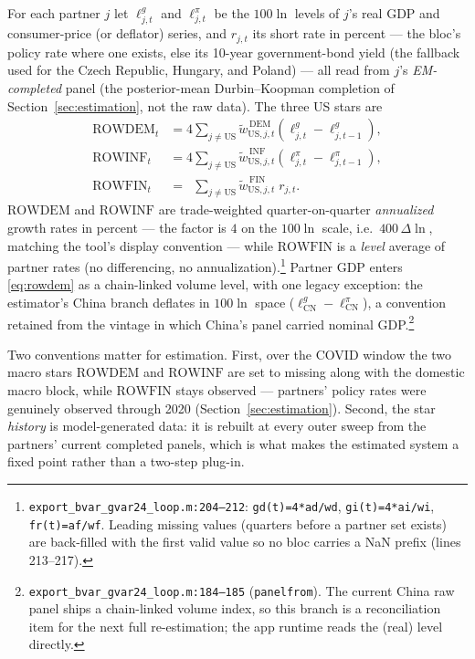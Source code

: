 \documentclass[11pt]{article}
\newcommand{\code}[1]{\texttt{\small #1}}
\begin{document}
For each partner $j$ let $\ell^{g}_{j,t}$ and $\ell^{\pi}_{j,t}$ be the $100\ln$ levels of $j$'s
real GDP and consumer-price (or deflator) series, and $r_{j,t}$ its short rate in percent --- the
bloc's policy rate where one exists, else its 10-year government-bond yield (the fallback used
for the Czech Republic, Hungary, and Poland) --- all read from $j$'s \emph{EM-completed} panel
(the posterior-mean Durbin--Koopman completion of Section~\ref{sec:estimation}, not the raw
data). The three US stars are
\begin{align}
  \mathrm{ROWDEM}_t &= 4 \sum_{j \neq \mathrm{US}} \tilde w^{\,\mathrm{DEM}}_{\mathrm{US},j,t}
      \left( \ell^{g}_{j,t} - \ell^{g}_{j,t-1} \right),
      \label{eq:rowdem}\\
  \mathrm{ROWINF}_t &= 4 \sum_{j \neq \mathrm{US}} \tilde w^{\,\mathrm{INF}}_{\mathrm{US},j,t}
      \left( \ell^{\pi}_{j,t} - \ell^{\pi}_{j,t-1} \right),
      \label{eq:rowinf}\\
  \mathrm{ROWFIN}_t &= \phantom{4} \sum_{j \neq \mathrm{US}} \tilde w^{\,\mathrm{FIN}}_{\mathrm{US},j,t}\; r_{j,t}.
      \label{eq:rowfin}
\end{align}
$\mathrm{ROWDEM}$ and $\mathrm{ROWINF}$ are trade-weighted quarter-on-quarter \emph{annualized}
growth rates in percent --- the factor is $4$ on the $100\ln$ scale, i.e.\
$400\,\Delta\ln$, matching the tool's display convention --- while $\mathrm{ROWFIN}$ is a
\emph{level} average of partner rates (no differencing, no
annualization).\footnote{\code{export\_bvar\_gvar24\_loop.m:204--212}: \code{gd(t)=4*ad/wd},
\code{gi(t)=4*ai/wi}, \code{fr(t)=af/wf}. Leading missing values (quarters before a partner
set exists) are back-filled with the first valid value so no bloc carries a NaN prefix
(lines 213--217).} Partner GDP enters \eqref{eq:rowdem} as a chain-linked volume level, with one
legacy exception: the estimator's China branch deflates in $100\ln$ space
($\ell^{g}_{\mathrm{CN}} - \ell^{\pi}_{\mathrm{CN}}$), a convention retained from the vintage in
which China's panel carried nominal GDP.\footnote{\code{export\_bvar\_gvar24\_loop.m:184--185}
(\code{panelfrom}). The current China raw panel ships a chain-linked volume index, so this branch
is a reconciliation item for the next full re-estimation; the app runtime reads the (real) level
directly.}

Two conventions matter for estimation. First, over the COVID window the two macro stars
$\mathrm{ROWDEM}$ and $\mathrm{ROWINF}$ are set to missing along with the domestic macro block,
while $\mathrm{ROWFIN}$ stays observed --- partners' policy rates were genuinely observed through
2020 (Section~\ref{sec:estimation}). Second, the star \emph{history} is model-generated data: it
is rebuilt at every outer sweep from the partners' current completed panels, which is what makes
the estimated system a fixed point rather than a two-step plug-in.
\end{document}
